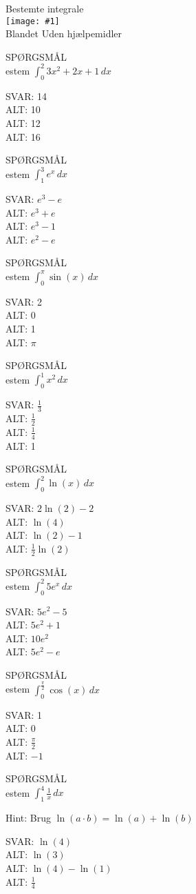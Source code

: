 \documentclass[]{article}
\newcounter{spgcounter}
\newenvironment{question}[2]{\addtocounter{spgcounter}{1} SPØRGSMÅL \thespgcounter\\}{\hspace{50px}}
\newcommand{\name}[1]{{\huge #1}\\}
\newcommand{\tag}[1]{#1}
\newcommand{\cover}[1]{\texttt{[image: \#1]}\\}
\newcommand{\answer}[1]{{\color{green} SVAR: #1}\\}
\newcommand{\alt}[1]{{\color{red} ALT: #1}\\}
\begin{document}
\name{Bestemte integrale}
\cover{bestemteintegrale.png}
\tag{Blandet}
\tag{Uden hjælpemidler}

\begin{question}{multi}

Bestem $\int_0^2 3x^2 + 2x + 1 \, dx$

\answer{14}
\alt{10}
\alt{12}
\alt{16}

\end{question}

\begin{question}{multi}

Bestem $\int_1^3 e^x \, dx$

\answer{$e^3 - e$}
\alt{$e^3 + e$}
\alt{$e^3 - 1$}
\alt{$e^2 - e$}

\end{question}

\begin{question}{multi}

Bestem $\int_0^{\pi} \sin(x) \, dx$

\answer{2}
\alt{0}
\alt{1}
\alt{$\pi$}

\end{question}

\begin{question}{multi}

Bestem $\int_0^1 x^2 \, dx$

\answer{$\frac{1}{3}$}
\alt{$\frac{1}{2}$}
\alt{$\frac{1}{4}$}
\alt{1}

\end{question}

\begin{question}{multi}

Bestem $\int_0^2 \ln(x) \, dx$

\answer{$2\ln(2) - 2$}
\alt{$\ln(4)$}
\alt{$\ln(2) - 1$}
\alt{$\frac{1}{2}\ln(2)$}

\end{question}

\begin{question}{multi}

Bestem $\int_0^2 5e^x \, dx$

\answer{$5e^2 - 5$}
\alt{$5e^2 + 1$}
\alt{$10e^2$}
\alt{$5e^2 - e$}

\end{question}

\begin{question}{multi}

Bestem $\int_0^{\frac{\pi}{2}} \cos(x) \, dx$

\answer{1}
\alt{0}
\alt{$\frac{\pi}{2}$}
\alt{$-1$}

\end{question}

\begin{question}{multi}

Bestem $\int_1^4 \frac{1}{x} \, dx$

Hint: Brug $\ln(a\cdot b) = \ln(a)+\ln(b)$

\answer{$\ln(4)$}
\alt{$\ln(3)$}
\alt{$\ln(4) - \ln(1)$}
\alt{$\frac{1}{4}$}

\end{question}
\end{document}
